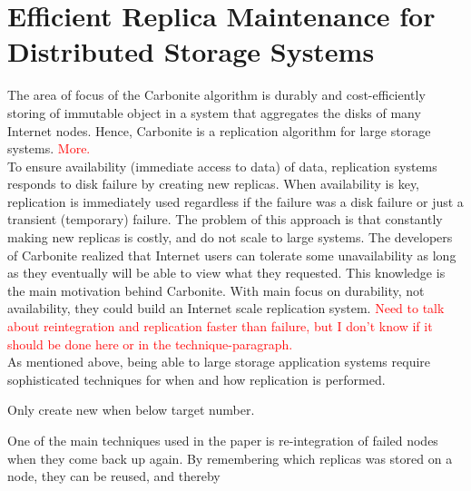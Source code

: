 \documentclass{article}
\begin{document}
\section*{Efficient Replica Maintenance for Distributed Storage Systems}

The area of focus of the Carbonite algorithm is durably and cost-efficiently storing of immutable object in a system that aggregates the disks of many Internet nodes. Hence, Carbonite is a replication algorithm for large storage systems. \textcolor{red}{More.}\\

\noindent To ensure availability (immediate access to data) of data, replication systems responds to disk failure by creating new replicas. When availability is key, replication is immediately used regardless if the failure was a disk failure or just a transient (temporary) failure. The problem of this approach is that constantly making new replicas is costly, and do not scale to large systems. The developers of Carbonite realized that Internet users can tolerate some unavailability as long as they eventually will be able to view what they requested. This knowledge is the main motivation behind Carbonite. With main focus on durability, not availability, they could build an Internet scale replication system. \textcolor{red}{Need to talk about reintegration and replication faster than failure, but I don't know if it should be done here or in the technique-paragraph.}\\

\noindent As mentioned above, being able to large storage application systems require sophisticated techniques for when and how replication is performed.

Only create new when below target number. 

One of the main techniques used in the paper is re-integration of failed nodes when they come back up again. By remembering which replicas was stored on a node, they can be reused, and thereby 
\end{document}
